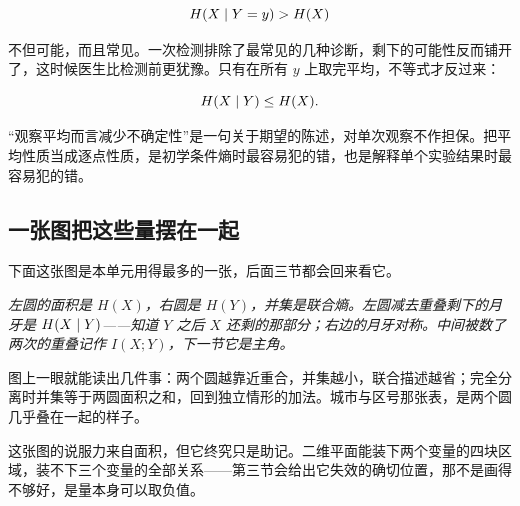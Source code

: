 \[
H(X\mid Y=y)>H(X)
\]

不但可能，而且常见。一次检测排除了最常见的几种诊断，剩下的可能性反而铺开了，这时候医生比检测前更犹豫。只有在所有 \(y\) 上取完平均，不等式才反过来：

\[
H(X\mid Y)\le H(X).
\]

``观察平均而言减少不确定性''是一句关于期望的陈述，对单次观察不作担保。把平均性质当成逐点性质，是初学条件熵时最容易犯的错，也是解释单个实验结果时最容易犯的错。

\subsection{一张图把这些量摆在一起}

下面这张图是本单元用得最多的一张，后面三节都会回来看它。

\begin{center}

\emph{左圆的面积是 \(H(X)\)，右圆是 \(H(Y)\)，并集是联合熵。左圆减去重叠剩下的月牙是 \(H(X\mid Y)\)——知道 \(Y\) 之后 \(X\) 还剩的那部分；右边的月牙对称。中间被数了两次的重叠记作 \(I(X;Y)\)，下一节它是主角。}
\end{center}

图上一眼就能读出几件事：两个圆越靠近重合，并集越小，联合描述越省；完全分离时并集等于两圆面积之和，回到独立情形的加法。城市与区号那张表，是两个圆几乎叠在一起的样子。

这张图的说服力来自面积，但它终究只是助记。二维平面能装下两个变量的四块区域，装不下三个变量的全部关系——第三节会给出它失效的确切位置，那不是画得不够好，是量本身可以取负值。

